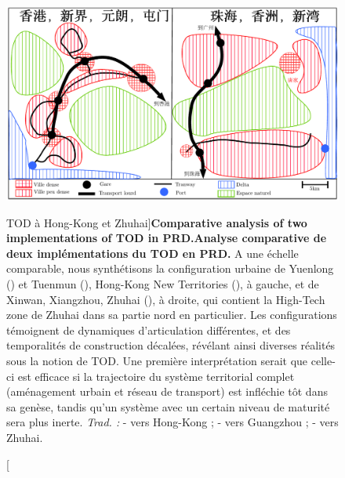 \begin{figure}
	\includegraphics[width=\linewidth]{Figures/Final/1-3-1-fig-qualitative-schema.pdf}
	\caption[TOD in Hong-Kong and Zhuhai][TOD à Hong-Kong et Zhuhai]{\textbf{Comparative analysis of two implementations of TOD in PRD.}\label{fig:qualitative:schema}}{\textbf{Analyse comparative de deux implémentations du TOD en PRD.} A une échelle comparable, nous synthétisons la configuration urbaine de Yuenlong () et Tuenmun (), Hong-Kong New Territories (), à gauche, et de Xinwan, Xiangzhou, Zhuhai (), à droite, qui contient la High-Tech zone de Zhuhai dans sa partie nord en particulier. Les configurations témoignent de dynamiques d'articulation différentes, et des temporalités de construction décalées, révélant ainsi diverses réalités sous la notion de TOD. Une première interprétation serait que celle-ci est efficace si la trajectoire du système territorial complet (aménagement urbain et réseau de transport) est infléchie tôt dans sa genèse, tandis qu'un système avec un certain niveau de maturité sera plus inerte. \textit{Trad. : }  - vers Hong-Kong ;  - vers Guangzhou ;  - vers Zhuhai.\label{fig:qualitative:schema}}
\end{figure}




